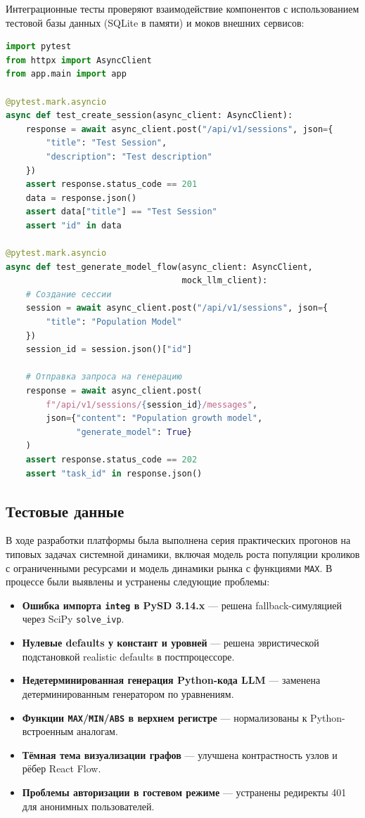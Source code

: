 Интеграционные тесты проверяют взаимодействие компонентов с использованием тестовой базы данных (SQLite в памяти) и моков внешних сервисов:

\begin{lstlisting}[caption={Пример интеграционного теста API}, language=Python, basicstyle=\ttfamily\scriptsize]
import pytest
from httpx import AsyncClient
from app.main import app

@pytest.mark.asyncio
async def test_create_session(async_client: AsyncClient):
    response = await async_client.post("/api/v1/sessions", json={
        "title": "Test Session",
        "description": "Test description"
    })
    assert response.status_code == 201
    data = response.json()
    assert data["title"] == "Test Session"
    assert "id" in data

@pytest.mark.asyncio
async def test_generate_model_flow(async_client: AsyncClient,
                                   mock_llm_client):
    # Создание сессии
    session = await async_client.post("/api/v1/sessions", json={
        "title": "Population Model"
    })
    session_id = session.json()["id"]

    # Отправка запроса на генерацию
    response = await async_client.post(
        f"/api/v1/sessions/{session_id}/messages",
        json={"content": "Population growth model",
              "generate_model": True}
    )
    assert response.status_code == 202
    assert "task_id" in response.json()
\end{lstlisting}

\subsection{Тестовые данные}

В ходе разработки платформы была выполнена серия практических прогонов на типовых задачах системной динамики, включая модель роста популяции кроликов с ограниченными ресурсами и модель динамики рынка с функциями \texttt{MAX}. В процессе были выявлены и устранены следующие проблемы:

\begin{itemize}
    \item \textbf{Ошибка импорта \texttt{integ} в PySD 3.14.x} --- решена fallback-симуляцией через SciPy \texttt{solve\_ivp}.
    \item \textbf{Нулевые defaults у констант и уровней} --- решена эвристической подстановкой realistic defaults в постпроцессоре.
    \item \textbf{Недетерминированная генерация Python-кода LLM} --- заменена детерминированным генератором по уравнениям.
    \item \textbf{Функции \texttt{MAX}/\texttt{MIN}/\texttt{ABS} в верхнем регистре} --- нормализованы к Python-встроенным аналогам.
    \item \textbf{Тёмная тема визуализации графов} --- улучшена контрастность узлов и рёбер React Flow.
    \item \textbf{Проблемы авторизации в гостевом режиме} --- устранены редиректы 401 для анонимных пользователей.
\end{itemize}

